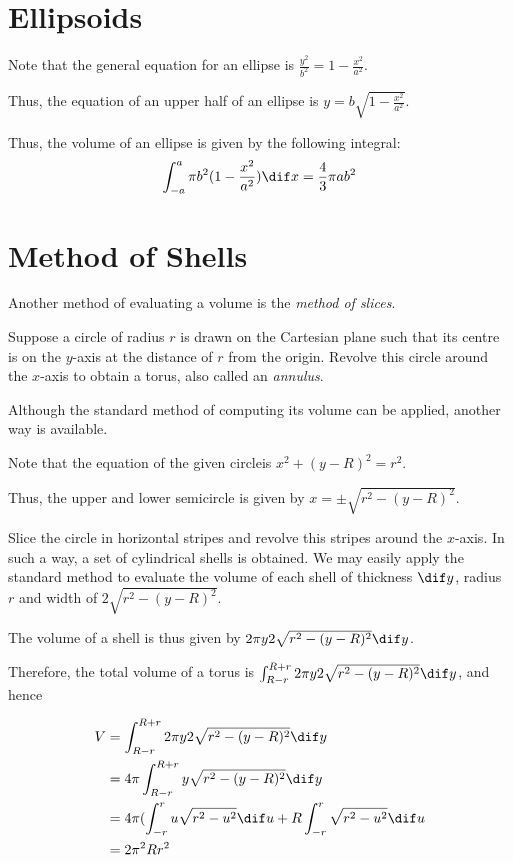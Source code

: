 \documentclass[11pt]{scrartcl}
\begin{document}
\section{Ellipsoids}

Note that the general equation for an ellipse is $\frac{y^2}{b^2} = 1- \frac{x^2}{a^2}$.

Thus, the equation of an upper half of an ellipse is $y = b \sqrt{1-\frac{x^2}{a^2}}$.

Thus, the volume of an ellipse is given by the following integral:
\begin{equation*}
  \int_{-a}^a \pi b^2(1-\frac{x^2}{a^2}) \dif x = \frac{4}{3}\pi ab^2
\end{equation*}

\section{Method of Shells}
Another method of evaluating a volume is the \textit{method of slices}.

Suppose a circle of radius $r$ is drawn on the Cartesian plane such that its centre is on the $y$-axis at the distance of $r$ from the origin. Revolve this circle around the $x$-axis to obtain a torus, also called an \textit{annulus}.

Although the standard method of computing its volume can be applied,
another way is available.

Note that the equation of the given circleis $x^2+(y-R)^2= r^2$.

Thus, the upper and lower semicircle is given by $x = \pm\sqrt{r^2-(y-R)^2}$.

Slice the circle in horizontal stripes and revolve this stripes around the $x$-axis. In such a way, a set of cylindrical shells is obtained. We may easily apply the standard method to evaluate the volume of each shell of thickness $\dif y$, radius $r$ and width of $2\sqrt{r^2-(y-R)^2}$.

The volume of a shell is thus given by $2\pi y \* 2 \sqrt{r^2-(y-R)^2} \dif y$.

Therefore, the total volume of a torus is $\int_{R-r}^{R+r}2\pi y \* 2 \sqrt{r^2-(y-R)^2} \dif y$, and hence

\begin{align}
  V & = \int_{R-r}^{R+r}2\pi y \* 2 \sqrt{r^2-(y-R)^2} \dif y                        \\
    & = 4\pi\int_{R-r}^{R+r} y \sqrt{r^2-(y-R)^2} \dif y                             \\
    & = 4\pi (\int_{-r}^ru \sqrt{r^2-u^2}\dif u + R \int_{-r}^r \sqrt{r^2-u^2}\dif u \\
    & = 2\pi^2Rr^2
\end{align}
\end{document}
